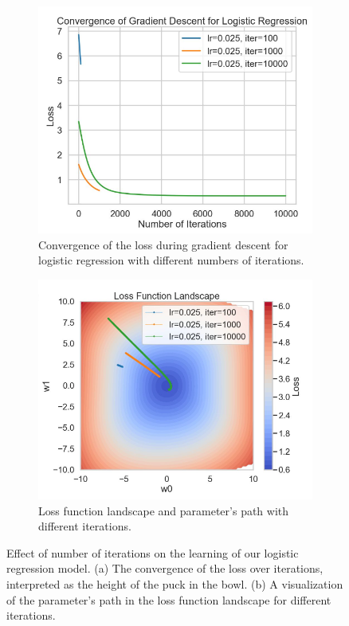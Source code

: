 \begin{figure}[h!]
    \centering
    \begin{subfigure}[b]{0.49\linewidth}
        \centering
        \includegraphics[width=\linewidth]{img/3_logr_gd_iters.png}
        \caption{Convergence of the loss during gradient descent for logistic regression with different numbers of iterations.}
        \label{fig:logr_gd_iters}
    \end{subfigure}
    \begin{subfigure}[b]{0.49\linewidth}
        \centering
        \includegraphics[width=\linewidth]{img/3_logr_loss_function_landscape_iters.png}
        \caption{Loss function landscape and parameter's path with different iterations.}
        \label{fig:logr_loss_landscape_iters}
    \end{subfigure}

    \caption{Effect of number of iterations on the learning of our logistic regression model. (a) The convergence of the loss over iterations, interpreted as the height of the puck in the bowl. (b) A visualization of the parameter's path in the loss function landscape for different iterations.}
    \label{fig:logr_iterations_effect}
\end{figure}

